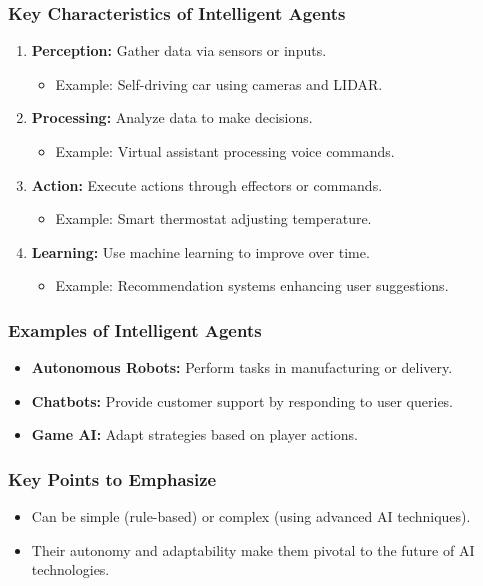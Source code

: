 \documentclass[aspectratio=169]{beamer}
\begin{document}
\begin{frame}[fragile]
    \frametitle{Key Characteristics of Intelligent Agents}
    \begin{enumerate}
        \item \textbf{Perception:} Gather data via sensors or inputs.
              \begin{itemize}
                  \item Example: Self-driving car using cameras and LIDAR.
              \end{itemize}
        \item \textbf{Processing:} Analyze data to make decisions.
              \begin{itemize}
                  \item Example: Virtual assistant processing voice commands.
              \end{itemize}
        \item \textbf{Action:} Execute actions through effectors or commands.
              \begin{itemize}
                  \item Example: Smart thermostat adjusting temperature.
              \end{itemize}
        \item \textbf{Learning:} Use machine learning to improve over time.
              \begin{itemize}
                  \item Example: Recommendation systems enhancing user suggestions.
              \end{itemize}
    \end{enumerate}
\end{frame}

\begin{frame}[fragile]
    \frametitle{Examples of Intelligent Agents}
    \begin{itemize}
        \item \textbf{Autonomous Robots:} Perform tasks in manufacturing or delivery.
        \item \textbf{Chatbots:} Provide customer support by responding to user queries.
        \item \textbf{Game AI:} Adapt strategies based on player actions.
    \end{itemize}
\end{frame}

\begin{frame}[fragile]
    \frametitle{Key Points to Emphasize}
    \begin{itemize}
        \item Can be simple (rule-based) or complex (using advanced AI techniques).
        \item Their autonomy and adaptability make them pivotal to the future of AI technologies.
    \end{itemize}
\end{frame}
\end{document}

